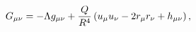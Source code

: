 \begin{equation}
{G_{\mu\nu}}=-\Lambda{g_{\mu\nu}}+{Q\over{R^4}}\left({u_\mu}{u_\nu}-
2{r_\mu}{r_\nu}+{h_{\mu\nu}}\right),\label{dem}
\end{equation}


